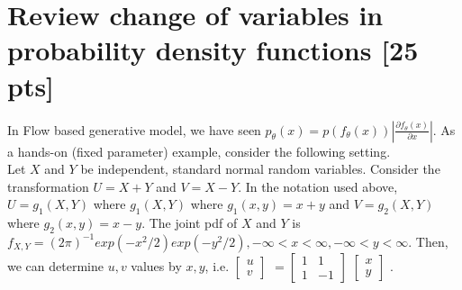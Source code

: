 \documentclass[a4paper]{article}
\theoremstyle{definition}
\begin{document}
	\section{Review change of variables in probability density functions [25 pts]} In Flow based generative model, we have seen $p_{\theta}(x)=p(f_{\theta}(x))|\frac{\partial f_{\theta}(x)}{\partial x}|$. As a hands-on (fixed parameter) example, consider the following setting.\\
	Let $X$ and $Y$ be independent, standard normal random variables. Consider the transformation $U=X+Y$ and $V=X-Y$. In the notation used above, $U=g_{1}(X, Y)$ where $g_{1}(X, Y)$ where $g_{1}(x, y)=x+y$ and $V=g_{2}(X, Y)$ where $g_{2}(x,y)=x-y$. The joint pdf of $X$ and $Y$ is $f_{X, Y}=(2\pi)^{-1} exp(-x^{2}/2) exp(-y^{2}/2), -\infty < x < \infty, -\infty < y < \infty$. Then, we can determine $u, v$ values by $x, y$, i.e. 
	$
	\begin{bmatrix}
		u\\
		v
	\end{bmatrix}
	$
	$=\begin{bmatrix}
		1 & 1 \\ 
		1 & -1
	\end{bmatrix}
	$
	$
	\begin{bmatrix}
		x\\
		y
	\end{bmatrix}
	$
	.
	
\end{document}
